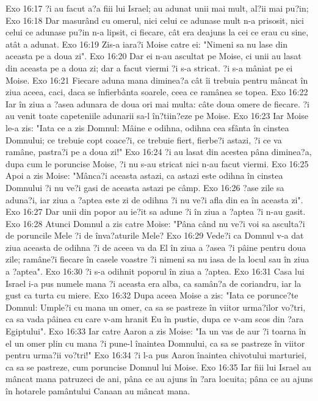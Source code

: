 Exo 16:17  ?i au facut a?a fiii lui Israel; au adunat unii mai mult, al?ii mai pu?in;
Exo 16:18  Dar masurând cu omerul, nici celui ce adunase mult n-a prisosit, nici celui ce adunase pu?in n-a lipsit, ci fiecare, cât era deajuns la cei ce erau cu sine, atât a adunat.
Exo 16:19  Zis-a iara?i Moise catre ei: "Nimeni sa nu lase din aceasta pe a doua zi".
Exo 16:20  Dar ei n-au ascultat pe Moise, ci unii au lasat din aceasta pe a doua zi; dar a facut viermi ?i s-a stricat. ?i s-a mâniat pe ei Moise.
Exo 16:21  Fiecare aduna mana diminea?a cât îi trebuia pentru mâncat în ziua aceea, caci, daca se înfierbânta soarele, ceea ce ramânea se topea.
Exo 16:22  Iar în ziua a ?asea adunara de doua ori mai multa: câte doua omere de fiecare. ?i au venit toate capeteniile adunarii sa-l în?tiin?eze pe Moise.
Exo 16:23  Iar Moise le-a zis: "Iata ce a zis Domnul: Mâine e odihna, odihna cea sfânta în cinstea Domnului; ce trebuie copt coace?i, ce trebuie fiert, fierbe?i astazi, ?i ce va ramâne, pastra?i pe a doua zi!"
Exo 16:24  ?i au lasat din acestea pâna diminea?a, dupa cum le poruncise Moise, ?i nu s-au stricat nici n-au facut viermi.
Exo 16:25  Apoi a zis Moise: "Mânca?i aceasta astazi, ca astazi este odihna în cinstea Domnului ?i nu ve?i gasi de aceasta astazi pe câmp.
Exo 16:26  ?ase zile sa aduna?i, iar ziua a ?aptea este zi de odihna ?i nu ve?i afla din ea în aceasta zi".
Exo 16:27  Dar unii din popor au ie?it sa adune ?i în ziua a ?aptea ?i n-au gasit.
Exo 16:28  Atunci Domnul a zis catre Moise: "Pâna când nu ve?i voi sa asculta?i de poruncile Mele ?i de înva?aturile Mele?
Exo 16:29  Vede?i ca Domnul v-a dat ziua aceasta de odihna ?i de aceea va da El în ziua a ?asea ?i pâine pentru doua zile; ramâne?i fiecare în casele voastre ?i nimeni sa nu iasa de la locul sau în ziua a ?aptea".
Exo 16:30  ?i s-a odihnit poporul în ziua a ?aptea.
Exo 16:31  Casa lui Israel i-a pus numele mana ?i aceasta era alba, ca samân?a de coriandru, iar la gust ca turta cu miere.
Exo 16:32  Dupa aceea Moise a zis: "Iata ce porunce?te Domnul: Umple?i cu mana un omer, ca sa se pastreze în viitor urma?ilor vo?tri, ca sa vada pâinea cu care v-am hranit Eu în pustie, dupa ce v-am scos din ?ara Egiptului".
Exo 16:33  Iar catre Aaron a zis Moise: "Ia un vas de aur ?i toarna în el un omer plin cu mana ?i pune-l înaintea Domnului, ca sa se pastreze în viitor pentru urma?ii vo?tri!"
Exo 16:34  ?i l-a pus Aaron înaintea chivotului marturiei, ca sa se pastreze, cum poruncise Domnul lui Moise.
Exo 16:35  Iar fiii lui Israel au mâncat mana patruzeci de ani, pâna ce au ajuns în ?ara locuita; pâna ce au ajuns în hotarele pamântului Canaan au mâncat mana.
